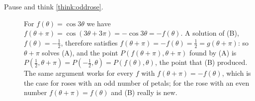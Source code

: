 \documentclass[11pt]{article}
\begin{document}
\begin{description}
  \item[Pause and think \ref{think:oddrose}.] For $f(\theta)=\cos3\theta$ we have $f(\theta+\pi)=\cos(3\theta+3\pi)=-\cos3\theta=-f(\theta)$. A solution of (B), $f(\theta)=-\frac12$, therefore satisfies $f(\theta+\pi)=-f(\theta)=\frac12=g(\theta+\pi)$: so $\theta+\pi$ solves (A), and the point $P\left(f(\theta+\pi),\theta+\pi\right)$ found by (A) is $P\left(\frac12,\theta+\pi\right)=P\left(-\frac12,\theta\right)=P(f(\theta),\theta)$, the point that (B) produced. The same argument works for every $f$ with $f(\theta+\pi)=-f(\theta)$, which is the case for roses with an odd number of petals; for the rose with an even number $f(\theta+\pi)=f(\theta)$ and (B) really is new.
\end{description}
\end{document}
